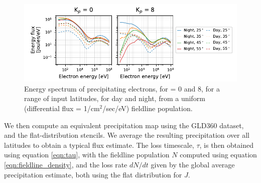 \begin{figure}[]
\begin{center}
\includegraphics{figures/stencil_energy_spectrum_flat_distribution.pdf}
\caption[Energy spectrum of LEP stencils, drawn from a uniform radiation belt population]{Energy spectrum of precipitating electrons, for \kp{}= 0 and 8, for a range of input latitudes, for day and night, from a uniform (differential flux = 1/cm$^2$/sec/eV) fieldline population.}
\label{fig:stencil_energy_spectrum_flat_distribution}
\end{center}
\end{figure}

We then compute an equivalent precipitation map using the GLD360 dataset, and the flat-distribution stencils. We average the resulting precipitation over all latitudes to obtain a typical flux estimate. The loss timescale, $\tau$, is then obtained using equation \eqref{eqn:tau}, with the fieldline population $N$ computed using equation \eqref{eqn:fieldline_density}, and the loss rate $dN/dt$ given by the global average precipitation estimate, both using the flat distribution for $J$.

